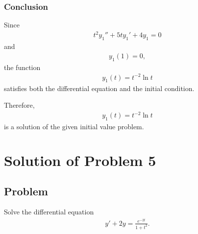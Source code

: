 \documentclass[letterpaper,10pt,english]{sphinxmanual}
\begin{document}
\subsubsection{Conclusion}
\label{\detokenize{Language/Science_language/ODE_calculus/course_MATH_3035/homework_assignments/index_pdf:conclusion}}
\sphinxAtStartPar
Since
\begin{equation*}
\begin{split}t^2y_1''+5ty_1'+4y_1=0\end{split}
\end{equation*}
\sphinxAtStartPar
and
\begin{equation*}
\begin{split}y_1(1)=0,\end{split}
\end{equation*}
\sphinxAtStartPar
the function
\begin{equation*}
\begin{split}y_1(t)=t^{-2}\ln t\end{split}
\end{equation*}
\sphinxAtStartPar
satisfies both the differential equation and the initial condition.

\sphinxAtStartPar
Therefore,
\begin{equation*}
\begin{split}\boxed{y_1(t)=t^{-2}\ln t}\end{split}
\end{equation*}
\sphinxAtStartPar
is a solution of the given initial value problem.




\section{Solution of Problem 5}
\label{\detokenize{Language/Science_language/ODE_calculus/course_MATH_3035/homework_assignments/index_pdf:solution-of-problem-5}}

\subsection{Problem}
\label{\detokenize{Language/Science_language/ODE_calculus/course_MATH_3035/homework_assignments/index_pdf:problem}}
\sphinxAtStartPar
Solve the differential equation
\begin{equation*}
\begin{split}y' + 2y = \frac{e^{-2t}}{1+t^2}.\end{split}
\end{equation*}
\end{document}
